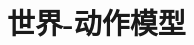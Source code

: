 \setcounter{chapter}{32}

\hypertarget{ux4e16ux754c-ux52a8ux4f5cux6a21ux578b}{%
\chapter{世界-动作模型}\label{ux4e16ux754c-ux52a8ux4f5cux6a21ux578b}}
